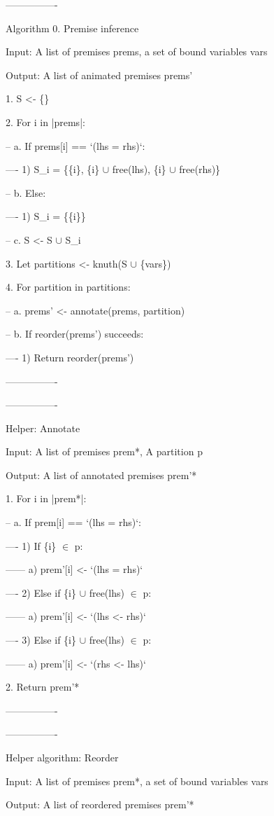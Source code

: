 ----------------

Algorithm 0. Premise inference

Input: A list of premises prems, a set of bound variables vars

Output: A list of animated premises prems'

1. S <- \{\}

2. For i in |prems|:

-- a. If prems[i] == `(lhs = rhs)`:

---- 1) S\_i = \{\{i\}, \{i\} $\cup$ free(lhs), \{i\} $\cup$ free(rhs)\}

-- b. Else:
    
---- 1) S\_i = \{\{i\}\}

-- c. S <- S $\cup$ S\_i

3. Let partitions <- knuth(S $\cup$ \{vars\})

4. For partition in partitions:
  
-- a. prems' <- annotate(prems, partition)

-- b. If reorder(prems') succeeds:

---- 1) Return reorder(prems')

----------------

----------------

Helper: Annotate

Input: A list of premises prem*, A partition p

Output: A list of annotated premises prem'*

1. For i in |prem*|:

-- a. If prem[i] == `(lhs = rhs)`:

---- 1) If \{i\} $\in$ p:

------ a) prem'[i] <- `(lhs = rhs)`

---- 2) Else if \{i\} $\cup$ free(lhs) $\in$ p:

------ a) prem'[i] <- `(lhs <- rhs)`

---- 3) Else if \{i\} $\cup$ free(lhs) $\in$ p:

------ a) prem'[i] <- `(rhs <- lhs)`

2. Return prem'*

----------------

----------------

Helper algorithm: Reorder

Input: A list of premises prem*, a set of bound variables vars

Output: A list of reordered premises prem'*

